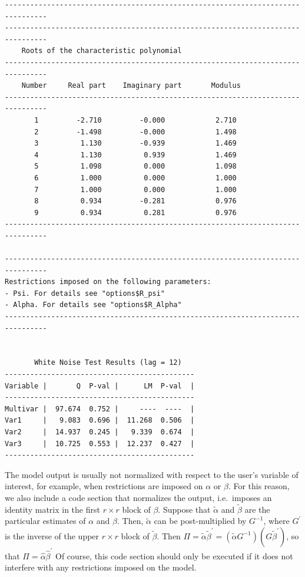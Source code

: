 \documentclass[article]{jss}
\begin{document}
\begin{verbatim}
--------------------------------------------------------------------------------
--------------------------------------------------------------------------------
    Roots of the characteristic polynomial                                                           
--------------------------------------------------------------------------------
    Number     Real part    Imaginary part       Modulus                                             
--------------------------------------------------------------------------------
       1         -2.710         -0.000            2.710                                        
       2         -1.498         -0.000            1.498                                        
       3          1.130         -0.939            1.469                                        
       4          1.130          0.939            1.469                                        
       5          1.098          0.000            1.098                                        
       6          1.000          0.000            1.000                                        
       7          1.000          0.000            1.000                                        
       8          0.934         -0.281            0.976                                        
       9          0.934          0.281            0.976                                        
--------------------------------------------------------------------------------

--------------------------------------------------------------------------------
Restrictions imposed on the following parameters:
- Psi. For details see "options$R_psi"
- Alpha. For details see "options$R_Alpha"
--------------------------------------------------------------------------------


       White Noise Test Results (lag = 12)
---------------------------------------------
Variable |       Q  P-val |      LM  P-val  |
---------------------------------------------
Multivar |  97.674  0.752 |     ----  ----  |
Var1     |   9.083  0.696 |  11.268  0.506  |
Var2     |  14.937  0.245 |   9.339  0.674  |
Var3     |  10.725  0.553 |  12.237  0.427  |
---------------------------------------------
\end{verbatim}

The model output is usually not normalized with respect to the user's variable of interest, for example, 
when restrictions are imposed on $\alpha$ or $\beta$. 
For this reason, we also include a code section that normalizes the output, 
i.e.\ imposes an identity matrix in the first $r \times r$ block of $\beta$. 
Suppose that $\tilde{\alpha}$ and $\tilde{\beta}$ are the particular estimates of $\alpha$ and $\beta$. 
Then, $\tilde{\alpha}$ can be post-multiplied by $G^{-1}$, where $G^{\prime}$ is the inverse of the 
upper $r \times r$ block of $\tilde{\beta}$. 
Then $\Pi= \tilde{\alpha}  \tilde{\beta}^{\prime} = (\tilde{\alpha}G^{-1}) (G\tilde{\beta}^{\prime})$, 
so that $\Pi= \hat{\alpha}\hat{\beta}^{\prime}$
Of course, this code section should only be executed if it does not interfere with any restrictions imposed on the model. 
\end{document}
